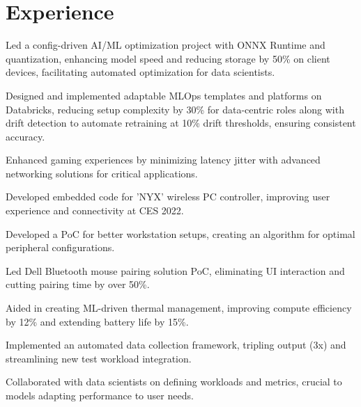 \documentclass[]{resume-openfont}
\begin{document}
    \begin{minipage}[t]{1\textwidth}
        \section{Experience}
        \sectiontitlerule

        \vspace{3mm}
        \begin{tightemize}
            \item Led a config-driven AI/ML optimization project with ONNX Runtime and quantization, enhancing model speed and reducing storage by 50\% on client devices, facilitating automated optimization for data scientists.
            \item Designed and implemented adaptable MLOps templates and platforms on Databricks, reducing setup complexity by 30\% for data-centric roles along with drift detection to automate retraining at 10\% drift thresholds, ensuring consistent accuracy.
            \item Enhanced gaming experiences by minimizing latency jitter with advanced networking solutions for critical applications.
            \item Developed embedded code for 'NYX' wireless PC controller, improving user experience and connectivity at CES 2022.
            \item Developed a PoC for better workstation setups, creating an algorithm for optimal peripheral configurations.
        \end{tightemize}
        \begin{tightemize}
            \item Led Dell Bluetooth mouse pairing solution PoC, eliminating UI interaction and cutting pairing time by over 50\%.
            \item Aided in creating ML-driven thermal management, improving compute efficiency by 12\% and extending battery life by 15\%.
            \item Implemented an automated data collection framework, tripling output (3x) and streamlining new test workload integration.
            \item Collaborated with data scientists on defining workloads and metrics, crucial to models adapting performance to user needs.
        \end{tightemize}


\end{minipage}
\end{document}
